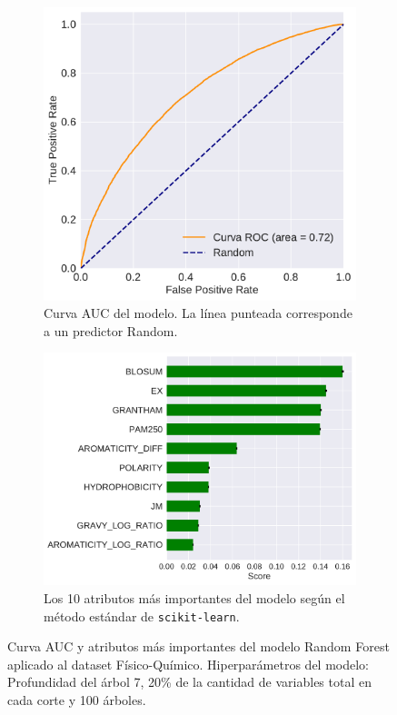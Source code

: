 \begin{figure}[H]
\centering
\begin{subfigure}[b]{0.7\textwidth}
    \centering
    \includegraphics[width=\textwidth]{documents/latex/figures/3/structural/auc_structural.pdf}
    \caption{Curva AUC del modelo. La línea punteada corresponde a un predictor Random.}
    \label{fig:auc_structural}
\end{subfigure}

\hfill
\hfill

\begin{subfigure}[b]{0.7\textwidth}
    \centering
    \includegraphics[width=\textwidth]{documents/latex/figures/3/structural/importances_structural.pdf}
    \caption{Los 10 atributos más importantes del modelo según el método estándar de \texttt{scikit-learn}.}
    \label{fig:importances_structural}
\end{subfigure}

\caption{Curva AUC y atributos más importantes del modelo Random Forest aplicado al dataset Físico-Químico. Hiperparámetros del modelo: Profundidad del árbol 7, 20\% de la cantidad de variables total en cada corte y 100 árboles.}
\end{figure}


